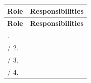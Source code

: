 \documentclass[10pt,letterpaper]{article}
\renewcommand\arraystretch{1.25}
\begin{document}
\begin{center}
\begingroup
\setlength\tabcolsep{2.0pt}
\footnotesize
\renewcommand\arraystretch{1.55}
\begin{longtable}{|>{\raggedright\arraybackslash}p{3.245in}|>{\raggedright\arraybackslash}p{3.245in}|}
\hline
\rowcolor{light}
\textbf{Role} & \textbf{Responsibilities} \\ \hline
\endfirsthead
\hline\rowcolor{light} \textbf{Role} & \textbf{Responsibilities} \\ \hline
\endhead
1. & \rule{0pt}{11pt}\hspace{0pt} \\ \hline
/ 2. & \rule{0pt}{11pt}\hspace{0pt} \\ \hline
/ 3. & \rule{0pt}{11pt}\hspace{0pt} \\ \hline
/ 4. & \rule{0pt}{11pt}\hspace{0pt} \\ \hline
\end{longtable}
\endgroup
\end{center}
\end{document}
